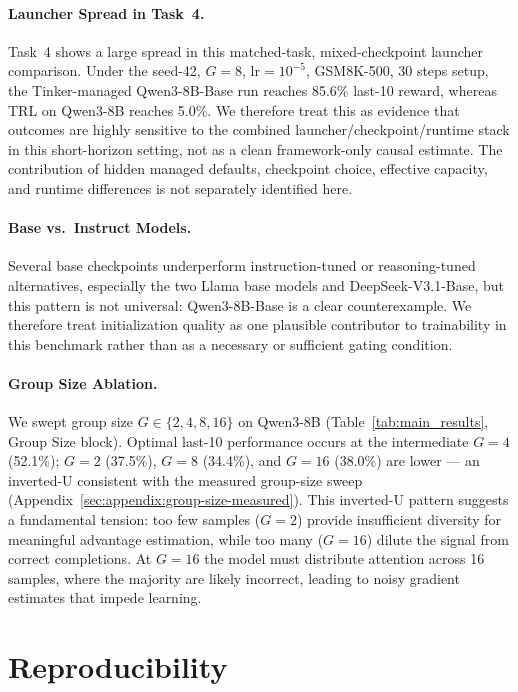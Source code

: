\documentclass{article}
\begin{document}
\paragraph{Launcher Spread in Task~4.}
Task~4 shows a large spread in this matched-task, mixed-checkpoint launcher
comparison. Under the seed-42, $G=8$, lr$=10^{-5}$, GSM8K-500, 30 steps setup, the Tinker-managed
Qwen3-8B-Base run reaches 85.6\% last-10 reward, whereas TRL on Qwen3-8B
reaches 5.0\%. We therefore treat this as evidence that outcomes are highly
sensitive to the combined launcher/checkpoint/runtime stack in this
short-horizon setting, not as a clean framework-only causal estimate. The
contribution of hidden managed defaults, checkpoint choice, effective
capacity, and runtime differences is not separately identified here.

\paragraph{Base vs.~Instruct Models.}
Several base checkpoints underperform instruction-tuned or reasoning-tuned
alternatives, especially the two Llama base models and DeepSeek-V3.1-Base, but
this pattern is not universal: Qwen3-8B-Base is a clear counterexample. We
therefore treat initialization quality as one plausible contributor to
trainability in this benchmark rather than as a necessary or sufficient gating
condition.

\paragraph{Group Size Ablation.}
We swept group size $G \in \{2, 4, 8, 16\}$ on Qwen3-8B (Table~\ref{tab:main_results}, Group Size block).
Optimal last-10 performance occurs at the intermediate $G{=}4$ (52.1\%); $G{=}2$ (37.5\%), $G{=}8$ (34.4\%), and $G{=}16$ (38.0\%) are lower --- an inverted-U consistent with the measured group-size sweep (Appendix~\ref{sec:appendix:group-size-measured}).
This inverted-U pattern suggests a fundamental tension: too few samples ($G{=}2$) provide insufficient diversity for meaningful advantage estimation, while too many ($G{=}16$) dilute the signal from correct completions.
At $G{=}16$ the model must distribute attention across 16 samples, where the majority are likely incorrect, leading to noisy gradient estimates that impede learning.

\section{Reproducibility}
\label{sec:reproducibility}
\end{document}
